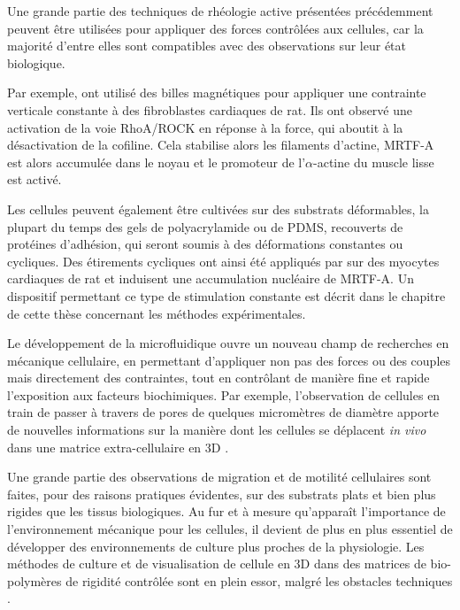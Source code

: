 Une grande partie des techniques de rhéologie active présentées précédemment peuvent être utilisées pour appliquer des forces contrôlées aux cellules, car la majorité d'entre elles sont compatibles avec des observations sur leur état biologique.

Par exemple, \cite{zhao_force_2007} ont utilisé des billes magnétiques pour appliquer une contrainte verticale constante à des fibroblastes cardiaques de rat. Ils ont observé une activation de la voie RhoA/ROCK en réponse à la force, qui aboutit à la désactivation de la cofiline. Cela stabilise alors les filaments d'actine, MRTF-A est alors accumulée dans le noyau et le promoteur de l'$\alpha$-actine  du muscle lisse est activé. 

Les cellules peuvent également être cultivées sur des substrats déformables, la plupart du temps des gels de polyacrylamide ou de PDMS, recouverts de protéines d'adhésion, qui seront soumis à des déformations constantes ou cycliques. Des étirements cycliques ont ainsi été appliqués par \cite{kuwahara_myocardin-related_2010} sur des myocytes cardiaques de rat et induisent une accumulation nucléaire de MRTF-A. 
Un dispositif permettant ce type de stimulation constante est décrit dans le chapitre de cette thèse concernant les méthodes expérimentales.  


Le développement de la microfluidique ouvre un nouveau champ de recherches en mécanique cellulaire, en permettant d'appliquer non pas des forces ou des couples mais directement des contraintes, tout en contrôlant de manière fine et rapide l'exposition aux facteurs biochimiques. 
Par exemple, l'observation de cellules en train de passer à travers de pores de quelques micromètres de diamètre apporte de nouvelles informations sur la manière dont les cellules se déplacent \textit{in vivo} dans une matrice extra-cellulaire en 3D \parencite{aubry_computational_2015}. 

Une grande partie des observations de migration et de motilité cellulaires sont faites, pour des raisons pratiques évidentes, sur des substrats plats et bien plus rigides que les tissus biologiques. Au fur et à mesure qu'apparaît l'importance de l'environnement mécanique pour les cellules, il devient de plus en plus essentiel de développer des environnements de culture plus proches de la physiologie. Les méthodes de culture et de visualisation de cellule en 3D dans des matrices de bio-polymères de rigidité contrôlée sont en plein essor, malgré les obstacles techniques \parencite{fischer_stiffness-controlled_2012}. 

%

